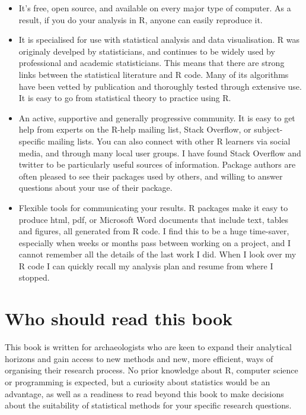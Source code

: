 \documentclass[]{book}
\begin{document}
\begin{itemize}
\item
  It's free, open source, and available on every major type of computer.
  As a result, if you do your analysis in R, anyone can easily reproduce
  it.
\item
  It is specialised for use with statistical analysis and data
  visualisation. R was originaly develped by statisticians, and
  continues to be widely used by professional and academic
  statisticians. This means that there are strong links between the
  statistical literature and R code. Many of its algorithms have been
  vetted by publication and thoroughly tested through extensive use. It
  is easy to go from statistical theory to practice using R.
\item
  An active, supportive and generally progressive community. It is easy
  to get help from experts on the R-help mailing list, Stack Overflow,
  or subject-specific mailing lists. You can also connect with other R
  learners via social media, and through many local user groups. I have
  found Stack Overflow and twitter to be particularly useful sources of
  information. Package authors are often pleased to see their packages
  used by others, and willing to answer questions about your use of
  their package.
\item
  Flexible tools for communicating your results. R packages make it easy
  to produce html, pdf, or Microsoft Word documents that include text,
  tables and figures, all generated from R code. I find this to be a
  huge time-saver, especially when weeks or months pass between working
  on a project, and I cannot remember all the details of the last work I
  did. When I look over my R code I can quickly recall my analysis plan
  and resume from where I stopped.
\end{itemize}

\section{Who should read this book}\label{who-should-read-this-book}

This book is written for archaeologists who are keen to expand their
analytical horizons and gain access to new methods and new, more
efficient, ways of organising their research process. No prior knowledge
about R, computer science or programming is expected, but a curiosity
about statistics would be an advantage, as well as a readiness to read
beyond this book to make decisions about the suitability of statistical
methods for your specific research questions.
\end{document}

